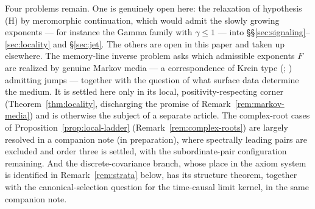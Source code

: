 Four problems remain. One is genuinely open here: the relaxation of hypothesis (H) by
meromorphic continuation, which would admit the slowly growing exponents --- for instance
the Gamma family with $\gamma \le 1$ --- into
\S\S\ref{sec:signaling}--\ref{sec:locality} and \S\ref{sec:jet}. The others are open in
this paper and taken up elsewhere. The memory-line inverse problem asks which admissible
exponents $F$ are realized by genuine Markov media --- a correspondence of Krein type
(; ) admitting jumps --- together with the
question of what surface data determine the medium. It is settled here only in its local,
positivity-respecting corner (Theorem~\ref{thm:locality}, discharging the promise of
Remark~\ref{rem:markov-media}) and is otherwise the subject of a separate article. The
complex-root cases of Proposition~\ref{prop:local-ladder}
(Remark~\ref{rem:complex-roots}) are largely resolved in a companion note (in
preparation), where
spectrally leading pairs are excluded and order three is settled, with the subordinate-pair
configuration remaining. And the discrete-covariance branch, whose place in the axiom
system is identified in Remark~\ref{rem:strata} below, has its structure theorem, together
with the canonical-selection question for the time-causal limit kernel, in the same
companion note.

